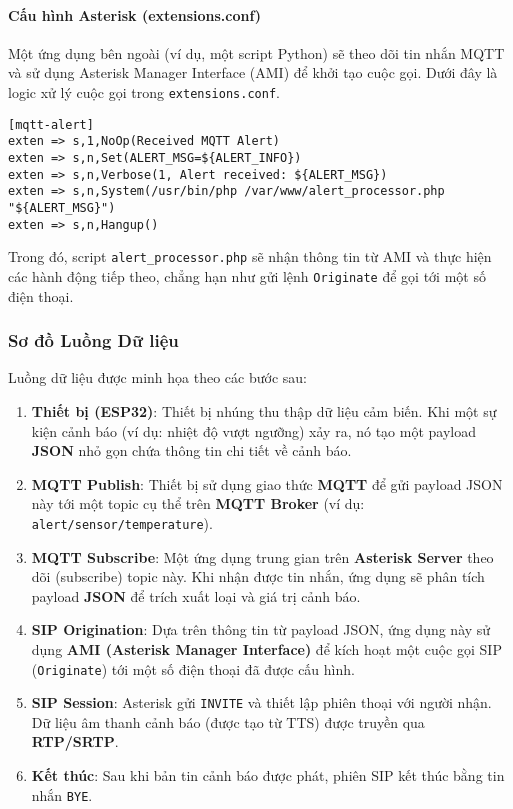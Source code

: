 \paragraph{Cấu hình Asterisk (extensions.conf)}
Một ứng dụng bên ngoài (ví dụ, một script Python) sẽ theo dõi tin nhắn MQTT và sử dụng Asterisk Manager Interface (AMI) để khởi tạo cuộc gọi. Dưới đây là logic xử lý cuộc gọi trong \texttt{extensions.conf}.
\begin{verbatim}
[mqtt-alert]
exten => s,1,NoOp(Received MQTT Alert)
exten => s,n,Set(ALERT_MSG=${ALERT_INFO})
exten => s,n,Verbose(1, Alert received: ${ALERT_MSG})
exten => s,n,System(/usr/bin/php /var/www/alert_processor.php "${ALERT_MSG}")
exten => s,n,Hangup()
\end{verbatim}
Trong đó, script \texttt{alert\_processor.php} sẽ nhận thông tin từ AMI và thực hiện các hành động tiếp theo, chẳng hạn như gửi lệnh \texttt{Originate} để gọi tới một số điện thoại.

\subsubsection{Sơ đồ Luồng Dữ liệu}
Luồng dữ liệu được minh họa theo các bước sau:
\begin{enumerate}
    \item \textbf{Thiết bị (ESP32)}: Thiết bị nhúng thu thập dữ liệu cảm biến. Khi một sự kiện cảnh báo (ví dụ: nhiệt độ vượt ngưỡng) xảy ra, nó tạo một payload \textbf{JSON} nhỏ gọn chứa thông tin chi tiết về cảnh báo.
    \item \textbf{MQTT Publish}: Thiết bị sử dụng giao thức \textbf{MQTT} để gửi payload JSON này tới một topic cụ thể trên \textbf{MQTT Broker} (ví dụ: \texttt{alert/sensor/temperature}).
    \item \textbf{MQTT Subscribe}: Một ứng dụng trung gian trên \textbf{Asterisk Server} theo dõi (subscribe) topic này. Khi nhận được tin nhắn, ứng dụng sẽ phân tích payload \textbf{JSON} để trích xuất loại và giá trị cảnh báo.
    \item \textbf{SIP Origination}: Dựa trên thông tin từ payload JSON, ứng dụng này sử dụng \textbf{AMI (Asterisk Manager Interface)} để kích hoạt một cuộc gọi SIP (\texttt{Originate}) tới một số điện thoại đã được cấu hình.
    \item \textbf{SIP Session}: Asterisk gửi \texttt{INVITE} và thiết lập phiên thoại với người nhận. Dữ liệu âm thanh cảnh báo (được tạo từ TTS) được truyền qua \textbf{RTP/SRTP}.
    \item \textbf{Kết thúc}: Sau khi bản tin cảnh báo được phát, phiên SIP kết thúc bằng tin nhắn \texttt{BYE}.
\end{enumerate}

